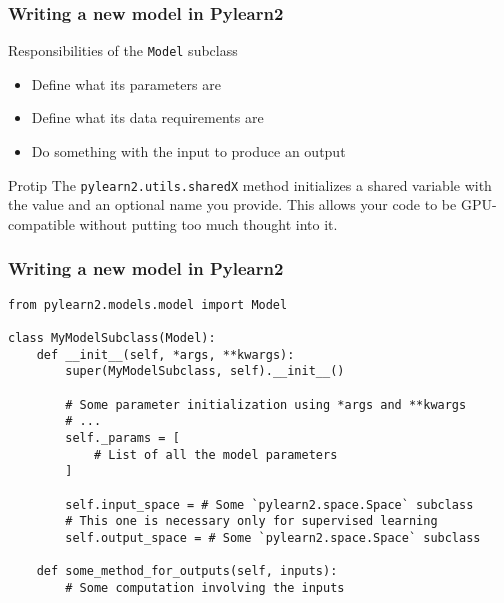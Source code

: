 \documentclass[mathserif, xcolor=dvipsnames]{beamer}
\begin{document}
\begin{frame}[fragile]
    \frametitle{Writing a new model in Pylearn2}
    \begin{block}{Responsibilities of the \texttt{Model} subclass}
    \begin{itemize}
        \item{Define what its parameters are}
        \item{Define what its data requirements are}
        \item{Do something with the input to produce an output}
    \end{itemize}
    \end{block}

    \begin{alertblock}{Protip}
    The \texttt{pylearn2.utils.sharedX} method initializes a shared variable
    with the value and an optional name you provide. This allows your code to
    be GPU-compatible without putting too much thought into it.
    \end{alertblock}
\end{frame}

\begin{frame}[fragile]
    \frametitle{Writing a new model in Pylearn2}
    \begin{examples}
\begin{lstlisting}[caption=Model subclass implementation mockup]
from pylearn2.models.model import Model

class MyModelSubclass(Model):
    def __init__(self, *args, **kwargs):
        super(MyModelSubclass, self).__init__()

        # Some parameter initialization using *args and **kwargs
        # ...
        self._params = [
            # List of all the model parameters
        ]

        self.input_space = # Some `pylearn2.space.Space` subclass
        # This one is necessary only for supervised learning
        self.output_space = # Some `pylearn2.space.Space` subclass

    def some_method_for_outputs(self, inputs):
        # Some computation involving the inputs
\end{lstlisting}
    \end{examples}
\end{frame}
\end{document}
